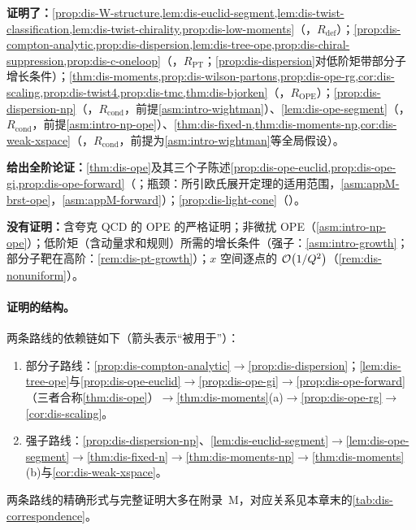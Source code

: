 \begin{tcolorbox}[enhanced,breakable,title=本章证明了什么／没有证明什么,fonttitle=\bfseries,
  colback=gray!3!white,colframe=gray!55!black,boxrule=0.6pt,arc=2pt,
  left=5pt,right=5pt,top=3pt,bottom=3pt,before skip=6pt,after skip=6pt]
\textbf{证明了：}\cref{prop:dis-W-structure,lem:dis-euclid-segment,lem:dis-twist-classification,lem:dis-twist-chirality,prop:dis-low-moments}（\tagR，$R_{\mathrm{def}}$）；\cref{prop:dis-compton-analytic,prop:dis-dispersion,lem:dis-tree-ope,prop:dis-chiral-suppression,prop:dis-c-oneloop}（\tagR，$R_{\mathrm{PT}}$；\cref{prop:dis-dispersion}对低阶矩带部分子增长条件）；\cref{thm:dis-moments,prop:dis-wilson-partons,prop:dis-ope-rg,cor:dis-scaling,prop:dis-twist4,prop:dis-tmc,thm:dis-bjorken}（\tagR，$R_{\mathrm{OPE}}$）；\cref{prop:dis-dispersion-np}（\tagR，$R_{\mathrm{cond}}$，前提\cref{asm:intro-wightman}）、\cref{lem:dis-ope-segment}（\tagR，$R_{\mathrm{cond}}$，前提\cref{asm:intro-np-ope}）、\cref{thm:dis-fixed-n,thm:dis-moments-np,cor:dis-weak-xspace}（\tagR，$R_{\mathrm{cond}}$，前提为\cref{asm:intro-wightman}等全局假设）。\par
\textbf{给出全阶论证：}\cref{thm:dis-ope}及其三个子陈述\cref{prop:dis-ope-euclid,prop:dis-ope-gi,prop:dis-ope-forward}（\tagA；瓶颈：所引欧氏展开定理的适用范围，\cref{asm:appM-brst-ope}，\cref{asm:appM-forward}）；\cref{prop:dis-light-cone}（\tagA）。\par
\textbf{没有证明：}含夸克 QCD 的 OPE 的严格证明；非微扰 OPE（\cref{asm:intro-np-ope}）；低阶矩（含动量求和规则）所需的增长条件（强子：\cref{asm:intro-growth}；部分子靶在高阶：\cref{rem:dis-pt-growth}）；$x$ 空间逐点的 $\mathcal{O}\!\left(1/Q^2\right)$（\cref{rem:dis-nonuniform}）。
\end{tcolorbox}

\paragraph{证明的结构。}两条路线的依赖链如下（箭头表示“被用于”）：
\begin{enumerate}[label=(\roman*),leftmargin=2.2em,itemsep=1pt,topsep=2pt]
\item 部分子路线：\cref{prop:dis-compton-analytic}$\to$\cref{prop:dis-dispersion}；\cref{lem:dis-tree-ope}与\cref{prop:dis-ope-euclid}$\to$\cref{prop:dis-ope-gi}$\to$\cref{prop:dis-ope-forward}（三者合称\cref{thm:dis-ope}）$\to$\cref{thm:dis-moments}(a)$\to$\cref{prop:dis-ope-rg}$\to$\cref{cor:dis-scaling}。
\item 强子路线：\cref{prop:dis-dispersion-np}、\cref{lem:dis-euclid-segment}$\to$\cref{lem:dis-ope-segment}$\to$\cref{thm:dis-fixed-n}$\to$\cref{thm:dis-moments-np}$\to$\cref{thm:dis-moments}(b)与\cref{cor:dis-weak-xspace}。
\end{enumerate}
两条路线的精确形式与完整证明大多在附录~M，对应关系见本章末的\cref{tab:dis-correspondence}。

